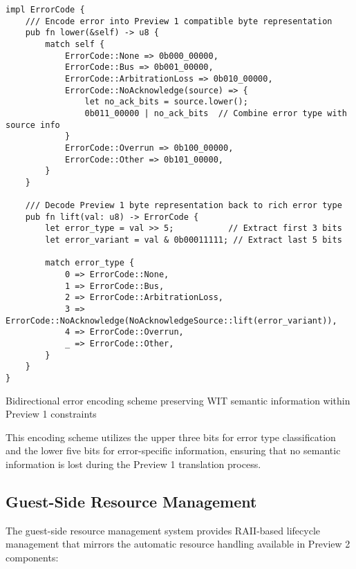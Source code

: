 \begin{listing}[H]
\begin{verbatim}
impl ErrorCode {
    /// Encode error into Preview 1 compatible byte representation
    pub fn lower(&self) -> u8 {
        match self {
            ErrorCode::None => 0b000_00000,
            ErrorCode::Bus => 0b001_00000,
            ErrorCode::ArbitrationLoss => 0b010_00000,
            ErrorCode::NoAcknowledge(source) => {
                let no_ack_bits = source.lower();
                0b011_00000 | no_ack_bits  // Combine error type with source info
            }
            ErrorCode::Overrun => 0b100_00000,
            ErrorCode::Other => 0b101_00000,
        }
    }

    /// Decode Preview 1 byte representation back to rich error type
    pub fn lift(val: u8) -> ErrorCode {
        let error_type = val >> 5;           // Extract first 3 bits
        let error_variant = val & 0b00011111; // Extract last 5 bits
        
        match error_type {
            0 => ErrorCode::None,
            1 => ErrorCode::Bus,
            2 => ErrorCode::ArbitrationLoss,
            3 => ErrorCode::NoAcknowledge(NoAcknowledgeSource::lift(error_variant)),
            4 => ErrorCode::Overrun,
            _ => ErrorCode::Other,
        }
    }
}
\end{verbatim}
\caption{Bidirectional error encoding scheme preserving WIT semantic information within Preview 1 constraints}
\label{lst:error-encoding}
\end{listing}

This encoding scheme utilizes the upper three bits for error type classification and the lower five bits for error-specific information, ensuring that no semantic information is lost during the Preview 1 translation process.

\subsection{Guest-Side Resource Management}

The guest-side resource management system provides RAII-based lifecycle management that mirrors the automatic resource handling available in Preview 2 components:

